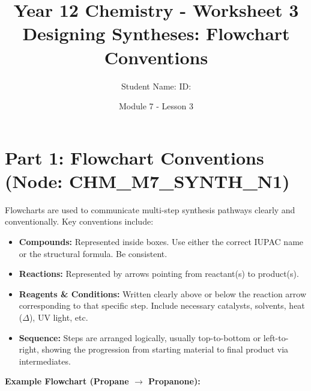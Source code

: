 \documentclass[11pt, a4paper]{article}
\title{Year 12 Chemistry - Worksheet 3 \\ Designing Syntheses: Flowchart Conventions}
\date{Module 7 - Lesson 3}
\author{Student Name: \underline{\hspace{5cm}} ID: \underline{\hspace{3cm}}}
\begin{document}
\maketitle

\section*{Part 1: Flowchart Conventions (Node: CHM\_M7\_SYNTH\_N1)}

Flowcharts are used to communicate multi-step synthesis pathways clearly and conventionally. Key conventions include:

\begin{itemize}
    \item \textbf{Compounds:} Represented inside boxes. Use either the correct IUPAC name or the structural formula. Be consistent.
    \item \textbf{Reactions:} Represented by arrows pointing from reactant(s) to product(s).
    \item \textbf{Reagents \& Conditions:} Written clearly above or below the reaction arrow corresponding to that specific step. Include necessary catalysts, solvents, heat ($\Delta$), UV light, etc.
    \item \textbf{Sequence:} Steps are arranged logically, usually top-to-bottom or left-to-right, showing the progression from starting material to final product via intermediates.
\end{itemize}

\textbf{Example Flowchart (Propane $\rightarrow$ Propanone):}

\end{document}
